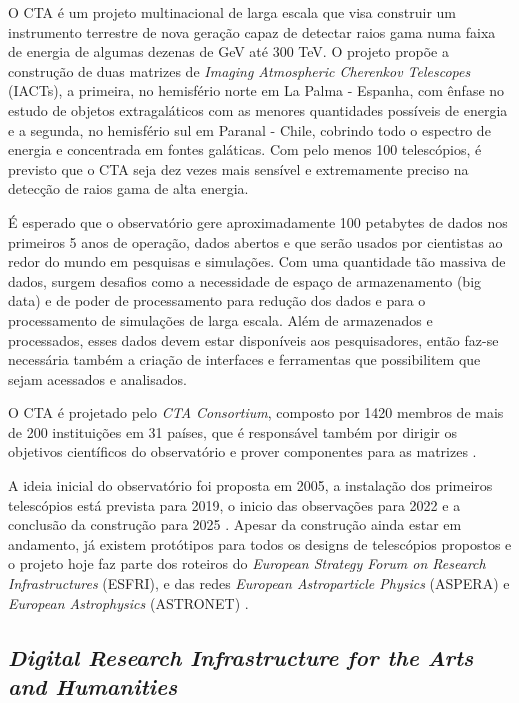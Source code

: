 \documentclass[10pt, conference, compsocconf]{IEEEtran}
\begin{document}
O CTA é um projeto multinacional de larga escala que visa construir um instrumento terrestre de nova geração capaz de detectar raios gama numa faixa de energia de algumas dezenas de GeV até 300 TeV. O projeto propõe a construção de duas matrizes de \textit{Imaging Atmospheric Cherenkov Telescopes} (IACTs), a primeira, no hemisfério norte em La Palma - Espanha, com ênfase no estudo de objetos extragaláticos com as menores quantidades possíveis de energia e a segunda, no hemisfério sul em Paranal - Chile, cobrindo todo o espectro de energia e concentrada em fontes galáticas. Com pelo menos 100 telescópios, é previsto que o CTA seja dez vezes mais sensível e extremamente preciso na detecção de raios gama de alta energia.\cite{CTA_technology}

É esperado que o observatório gere aproximadamente 100 petabytes de dados nos primeiros 5 anos de operação, dados abertos e que serão usados por cientistas ao redor do mundo em pesquisas e simulações. Com uma quantidade tão massiva de dados, surgem desafios como a necessidade de espaço de armazenamento (big data) e de poder de processamento para redução dos dados e para o processamento de simulações de larga escala. Além de armazenados e processados, esses dados devem estar disponíveis aos pesquisadores, então faz-se necessária também a criação de interfaces e ferramentas que possibilitem que sejam acessados e analisados.\cite{CTA_data, EGI_research-stories_cta, EGI_research-infrastructures_cta}

O CTA é projetado pelo \textit{CTA Consortium}, composto por 1420 membros de mais de 200 instituições em 31 países, que é responsável também por dirigir os objetivos científicos do observatório e prover componentes para as matrizes \cite{CTA_cta_consortium}.

A ideia inicial do observatório foi proposta em 2005, a instalação dos primeiros telescópios está prevista para 2019, o inicio das observações para 2022 e a conclusão da construção para 2025 \cite{CTA_status}. Apesar da construção ainda estar em andamento, já existem protótipos para todos os designs de telescópios propostos \cite{CTA_technology} e o projeto hoje faz parte dos roteiros do \textit{European Strategy Forum on Research Infrastructures} (ESFRI), e das redes \textit{European Astroparticle Physics} (ASPERA) e \textit{European Astrophysics} (ASTRONET) \cite{CTA_about}.


\subsection{\textit{Digital Research Infrastructure for the Arts and Humanities}}
\end{document}
